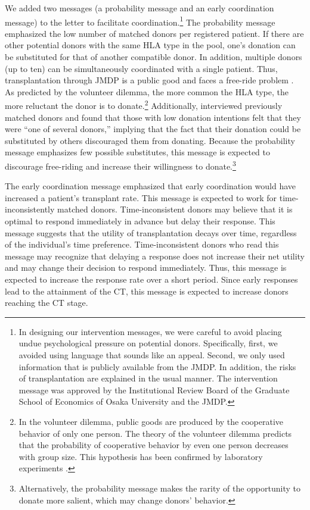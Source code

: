 \documentclass [12pt, a4paper]{article}
\begin{document}
We added two messages (a probability message and an early coordination message) to the letter to facilitate coordination.\footnote{In designing our intervention messages, we were careful to avoid placing undue psychological pressure on potential donors. Specifically, first, we avoided using language that sounds like an appeal. Second, we only used information that is publicly available from the JMDP. In addition, the risks of transplantation are explained in the usual manner. The intervention message was approved by the Institutional Review Board of the Graduate School of Economics of Osaka University and the JMDP.} The probability message emphasized the low number of matched donors per registered patient. If there are other potential donors with the same HLA type in the pool, one's donation can be substituted for that of another compatible donor. In addition, multiple donors (up to ten) can be simultaneously coordinated with a single patient. Thus, transplantation through JMDP is a public good and faces a free-ride problem \citep{Bergstrom2009}. As predicted by the volunteer dilemma, the more common the HLA type, the more reluctant the donor is to donate.\footnote{In the volunteer dilemma, public goods are produced by the cooperative behavior of only one person. The theory of the volunteer dilemma predicts that the probability of cooperative behavior by even one person decreases with group size. This hypothesis has been confirmed by laboratory experiments \citep{Diekmann1985, Diekmann1986, Franzen1999, Davis2017}.} Additionally, \citet{Kurosawa2022} interviewed previously matched donors and found that those with low donation intentions felt that they were ``one of several donors,'' implying that the fact that their donation could be substituted by others discouraged them from donating. Because the  probability message emphasizes few possible substitutes, this message is expected to discourage free-riding and increase their willingness to donate.\footnote{Alternatively, the probability message makes the rarity of the opportunity to donate more salient, which may change donors' behavior.}



The early coordination message emphasized that early coordination would have increased a patient's transplant rate. This message is expected to work for time-inconsistently matched donors. Time-inconsistent donors may believe that it is optimal to respond immediately in advance but delay their response. This message suggests that the utility of transplantation decays over time, regardless of the individual's time preference. Time-inconsistent donors who read this message may recognize that delaying a response does not increase their net utility and may change their decision to respond immediately. Thus, this message is expected to increase the response rate over a short period. Since early responses lead to the attainment of the CT, this message is expected to increase donors reaching the CT stage.
\end{document}
